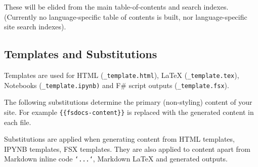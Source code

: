 \documentclass{article}
\begin{document}
These will be elided from the main table-of-contents and search indexes.  (Currently no language-specific
table of contents is built, nor language-specific site search indexes).
\subsection*{Templates and Substitutions}



Templates are used for HTML (\texttt{\_template.html}), LaTeX (\texttt{\_template.tex}), Notebooks (\texttt{\_template.ipynb)}
and F\# script outputs (\texttt{\_template.fsx}).


The following substitutions determine the primary (non-styling) content of your site.
For example \texttt{\{\{fsdocs-content\}\}} is replaced with the generated content in each file.


Substitutions are applied when generating content from HTML templates, IPYNB templates, FSX templates.
They are also applied to content apart from Markdown inline code \texttt{`...`}, Markdown LaTeX and
generated outputs.
\end{document}
